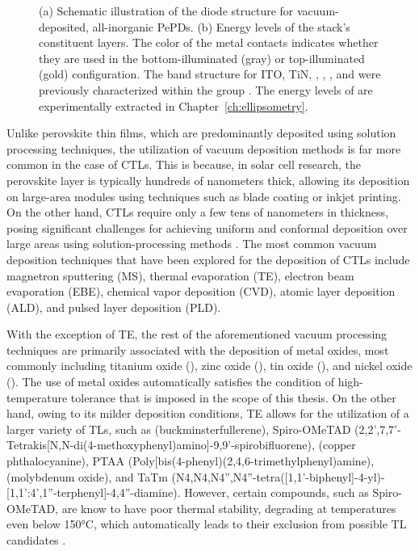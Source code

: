 \begin{figure}[htbp]
    \caption[Schematic illustration of PePD stack and all layers' energy levels.]{(a) Schematic illustration of the diode structure for vacuum-deposited, all-inorganic PePDs. (b) Energy levels of the stack's constituent layers. The color of the metal contacts indicates whether they are used in the bottom-illuminated (gray) or top-illuminated (gold) configuration. The band structure for ITO, TiN, , , , and  were previously characterized within the group \cite{Siddik2024PbSDetectors,Siddik2023Interface-EngineeredApplications}. The energy levels of  are experimentally extracted in Chapter~\ref{ch:ellipsometry}.}
    \label{fig:ch2:stack_and_energy_landscape}
\end{figure}

Unlike perovskite thin films, which are predominantly deposited using solution processing techniques, the utilization of vacuum deposition methods is far more common in the case of CTLs. This is because, in solar cell research, the perovskite layer is typically hundreds of nanometers thick, allowing its deposition on large-area modules using techniques such as blade coating or inkjet printing. On the other hand, CTLs require only a few tens of nanometers in thickness, posing significant challenges for achieving uniform and conformal deposition over large areas using solution-processing methods \cite{Luo2025VacuumModules}. The most common vacuum deposition techniques that have been explored for the deposition of CTLs include magnetron sputtering (MS), thermal evaporation (TE), electron beam evaporation (EBE), chemical vapor deposition (CVD), atomic layer deposition (ALD), and pulsed layer deposition (PLD).

With the exception of TE, the rest of the aforementioned vacuum processing techniques are primarily associated with the deposition of metal oxides, most commonly including titanium oxide (), zinc oxide (), tin oxide (), and nickel oxide (). The use of metal oxides automatically satisfies the condition of high-temperature tolerance that is imposed in the scope of this thesis. On the other hand, owing to its milder deposition conditions, TE allows for the utilization of a larger variety of TLs, such as  (buckminsterfullerene), Spiro-OMeTAD (2,2',7,7'-Tetrakis[N,N-di(4-methoxyphenyl)amino]-9,9'-spirobifluorene),  (copper phthalocyanine), PTAA (Poly[bis(4-phenyl)(2,4,6-trimethylphenyl)amine),  (molybdenum oxide), and TaTm (N4,N4,N4'',N4''-tetra([1,1'-biphenyl]-4-yl)-[1,1':4',1''-terphenyl]-4,4''-diamine). However, certain compounds, such as Spiro-OMeTAD, are know to have poor thermal stability, degrading at temperatures even below 150°C, which automatically leads to their exclusion from possible TL candidates \cite{Zhao2017EffectCells, Tumen-Ulzii2020UnderstandingTemperature, Jeong2022ChallengesCells}. 


